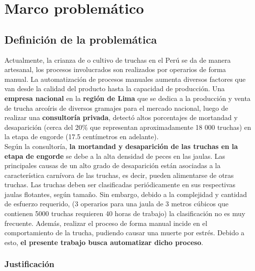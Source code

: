 

\doublespacing
\chapter{Marco problemático}
\section{Definición de la problemática}

Actualmente, la crianza de o cultivo de truchas en el Perú se da de manera artesanal, los procesos involucrados son realizados por operarios de forma manual. La automatización de procesos manuales aumenta diversos factores que van desde la calidad del producto hasta la capacidad de producción. Una \textbf{empresa nacional} en la \textbf{región de Lima} que se dedica a la producción y venta de trucha arcoíris de diversos gramajes para el mercado nacional, luego de realizar una \textbf{consultoría privada}, detectó altos porcentajes de mortandad y desaparición (cerca del 20\% que representan aproximadamente 18 000 truchas) en la etapa de engorde (17.5 centímetros en adelante).\\
Según la consultoría, \textbf{la mortandad y desaparición de las truchas en la etapa de engorde} se debe a la alta densidad de peces en las jaulas. Las principales causas de un alto grado de desaparición están asociadas a la característica carnívora de las truchas, es decir, pueden alimentarse de otras truchas. Las truchas deben ser clasificadas periódicamente en sus respectivas jaulas flotantes, según tamaño. Sin embargo, debido a la complejidad y cantidad de esfuerzo requerido, (3 operarios para una jaula de 3 metros cúbicos que contienen 5000 truchas requieren 40  horas de trabajo) la clasificación no es muy frecuente. Además, realizar el proceso de forma manual incide en el comportamiento de la trucha, pudiendo causar una muerte por estrés. Debido a esto, \textbf{el presente trabajo busca automatizar dicho proceso}.\\

\subsection{Justificación}

